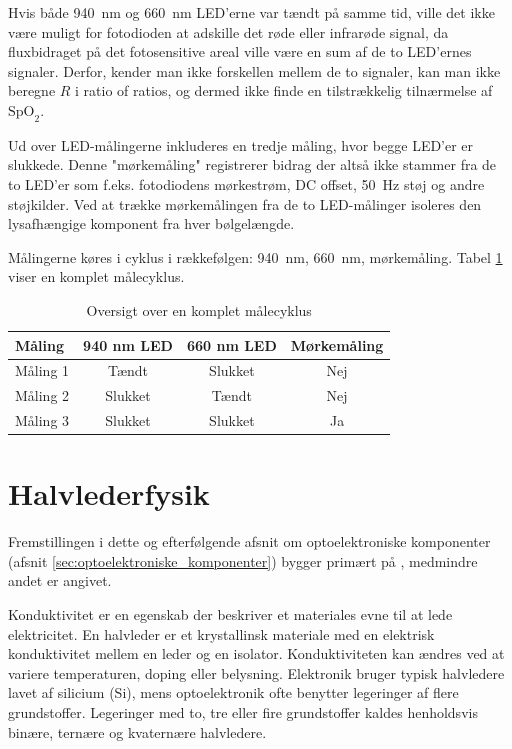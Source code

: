 Hvis både \SI{940}{nm} og \SI{660}{nm} LED'erne var tændt på samme tid, ville det ikke være muligt for fotodioden at adskille det røde eller infrarøde signal, da fluxbidraget på det fotosensitive areal ville være en sum af de to LED'ernes signaler. Derfor, kender man ikke forskellen mellem de to signaler, kan man ikke beregne $R$ i ratio of ratios, og dermed ikke finde en tilstrækkelig tilnærmelse af $\text{SpO}_2$.

Ud over LED-målingerne inkluderes en tredje måling, hvor begge LED'er er slukkede. Denne "mørkemåling" registrerer bidrag der altså ikke stammer fra de to LED'er som f.eks. fotodiodens mørkestrøm, DC offset, \SI{50}{Hz} støj og andre støjkilder. Ved at trække mørkemålingen fra de to LED-målinger isoleres den lysafhængige komponent fra hver bølgelængde.

Målingerne køres i cyklus i rækkefølgen: \SI{940}{nm}, \SI{660}{nm}, mørkemåling. Tabel \ref{tab:maalinger} viser en komplet målecyklus.

\begin{table}[h]
\centering
\caption{Oversigt over en komplet målecyklus}
\label{tab:maalinger}
\begin{tabular}{lccc}
\toprule
Måling & 940 nm LED & 660 nm LED & Mørkemåling\\
\midrule
Måling 1 & Tændt & Slukket & Nej \\
Måling 2 & Slukket & Tændt & Nej \\
Måling 3 & Slukket & Slukket & Ja \\
\bottomrule
\end{tabular}
\end{table}


\section{Halvlederfysik}
\label{sec:halvleder}

Fremstillingen i dette og efterfølgende afsnit om optoelektroniske komponenter (afsnit \ref{sec:optoelektroniske_komponenter}) bygger primært på \cite[Kap.~16--18]{Saleh2007}, medmindre andet er angivet.

Konduktivitet er en egenskab der beskriver et materiales evne til at lede elektricitet. En halvleder er et krystallinsk materiale med en elektrisk konduktivitet mellem en leder og en isolator. 
Konduktiviteten kan ændres ved at variere temperaturen, doping eller belysning. Elektronik bruger typisk halvledere lavet af silicium (Si), mens optoelektronik ofte benytter legeringer af flere grundstoffer. Legeringer med to, tre eller fire grundstoffer kaldes henholdsvis binære, ternære og kvaternære halvledere.

